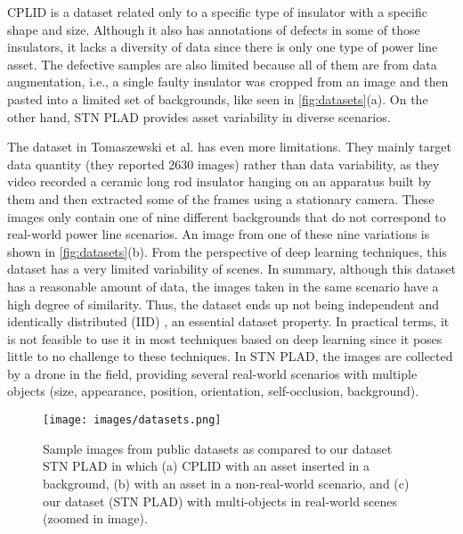 \documentclass[10pt,conference]{IEEEtran}
\begin{document}
CPLID \cite{tao2018cplid} is a dataset related only to a specific type of insulator with a specific shape and size. Although it also has annotations of defects in some of those insulators, it lacks a diversity of data since there is only one type of power line asset. The defective samples are also limited because all of them are from data augmentation, i.e., a single faulty insulator was cropped from an image and then pasted into a limited set of backgrounds, like seen in \autoref{fig:datasets}(a). On the other hand, STN PLAD provides asset variability in diverse scenarios.

The dataset in Tomaszewski et al. \cite{tomaszewski2018collection} has even more limitations. They mainly target data quantity (they reported 2630 images) rather than data variability, as they video recorded a ceramic long rod insulator hanging on an apparatus built by them and then extracted some of the frames using a stationary camera. These images only contain one of nine different backgrounds that do not correspond to real-world power line scenarios. An image from one of these nine variations is shown in \autoref{fig:datasets}(b). From the perspective of deep learning techniques, this dataset has a very limited variability of scenes. In summary, although this dataset has a reasonable amount of data, the images taken in the same scenario have a high degree of similarity. Thus, the dataset ends up not being independent and identically distributed (IID) \cite{bottou2010large, rakhlin2012making}, an essential dataset property. In practical terms, it is not feasible to use it in most techniques based on deep learning since it poses little to no challenge to these techniques. In STN PLAD, the images are collected by a drone in the field, providing several real-world scenarios with multiple objects (size, appearance, position, orientation, self-occlusion, background). 

\begin{figure}
\captionsetup{justification=centering}
\centering


\texttt{[image: images/datasets.png]}
\caption{Sample images from public datasets as compared to our dataset STN PLAD in which (a) CPLID \cite{tao2018cplid} with an asset inserted in a background, (b) \cite{tomaszewski2018collection} with an asset in a non-real-world scenario, and (c) our dataset (STN PLAD) with multi-objects in real-world scenes (zoomed in image).
}
\label{fig:datasets}
\end{figure}
\end{document}
